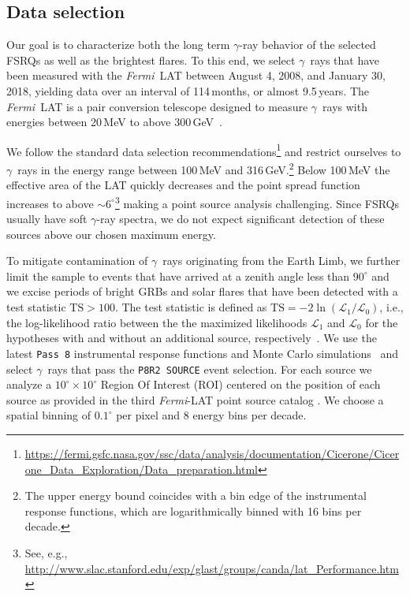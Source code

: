 \documentclass[twocolumn,linenumbers]{aastex62}
\newcommand{\Grays}{$\gamma$~rays\xspace}
\newcommand{\gray}{$\gamma$-ray\xspace}
\newcommand{\FermiLAT}{\emph{Fermi}~LAT\xspace}
\newcommand{\fermiLAT}{\emph{Fermi}-LAT\xspace}
\begin{document}
\subsection{Data selection}

Our goal is to characterize both the long term \gray behavior of the selected FSRQs as well as the brightest flares.
To this end, we select \Grays that have been measured with the \FermiLAT between August 4, 2008, and January 30, 2018, yielding data over an interval of 114\,months, or almost 9.5\,years.
The \FermiLAT is a pair conversion telescope designed to measure \Grays with energies between 20\,MeV to above 300\,GeV~\citep{2009ApJ...697.1071A}.

We follow the standard data selection recommendations\footnote{\url{https://fermi.gsfc.nasa.gov/ssc/data/analysis/documentation/Cicerone/Cicerone_Data_Exploration/Data_preparation.html}} and  restrict ourselves to \Grays in the energy range between 100\,MeV and 316\,GeV.\footnote{The upper energy bound  coincides with a bin edge of the instrumental response functions, which are logarithmically binned with 16 bins per decade.}
Below 100\,MeV the effective area of the LAT quickly decreases and the point spread function increases to above $\sim 6^\circ$\footnote{See, e.g., \url{http://www.slac.stanford.edu/exp/glast/groups/canda/lat_Performance.htm}} making a point source analysis challenging. 
Since FSRQs usually have soft \gray spectra, we do not expect significant detection of these sources above our chosen maximum energy.

To mitigate contamination of \Grays originating from the Earth Limb, we further limit the sample to events that have arrived at a zenith angle less than $90^\circ$ and we excise periods of bright GRBs and solar flares that have been detected with a test statistic $\mathrm{TS} > 100$.
The test statistic is defined as $\mathrm{TS} = -2\ln(\mathcal{L}_1 / \mathcal{L}_0)$, i.e., the log-likelihood ratio between the the maximized likelihoods $\mathcal{L}_1$ and $\mathcal{L}_0$ for the hypotheses with and without an additional source, respectively~\citep{mattox1996}.
We use the latest \texttt{Pass 8} instrumental response functions and Monte Carlo simulations~\citep{pass8} and select \Grays that pass the \texttt{P8R2 SOURCE} event selection. 
For each source we analyze a $10^\circ \times 10^\circ$ Region Of Interest (ROI) centered on the position of each source as provided in the third \fermiLAT point source catalog \citep[3FGL,][]{3fgl}.
We choose a spatial binning of $0.1^\circ$ per pixel and 8 energy bins per decade. 
\end{document}
